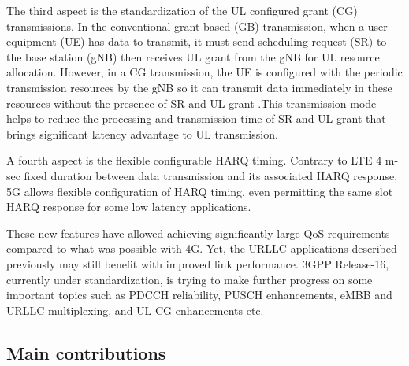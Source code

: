 \documentclass{ieeeaccess}
\begin{document}
The third aspect is the standardization of the UL configured grant (CG) transmissions. In the conventional grant-based (GB) transmission, when a user equipment (UE) has data to transmit, it must send scheduling request (SR) to the base station (gNB) then receives UL grant from the gNB for UL resource allocation. However, in a CG transmission, the UE is configured with the periodic transmission resources by the gNB so it can transmit data immediately in these resources without the presence of SR and UL grant \cite{ref5}.This transmission mode helps to reduce the processing and transmission time of SR and UL grant that brings significant latency advantage to UL transmission.

A fourth aspect is the flexible configurable HARQ timing. Contrary to LTE 4 m-sec fixed duration between data transmission and its associated HARQ response, 5G allows flexible configuration of HARQ timing, even permitting the same slot HARQ response for some low latency applications.

These new features have allowed achieving significantly large QoS requirements compared to what was possible with 4G. Yet, the URLLC applications described previously may still benefit with improved link performance. 3GPP Release-16, currently under standardization, is trying to make further progress on some important topics such as PDCCH reliability, PUSCH enhancements, eMBB and URLLC multiplexing, and UL CG enhancements etc. 

\subsection{Main contributions}
\end{document}

